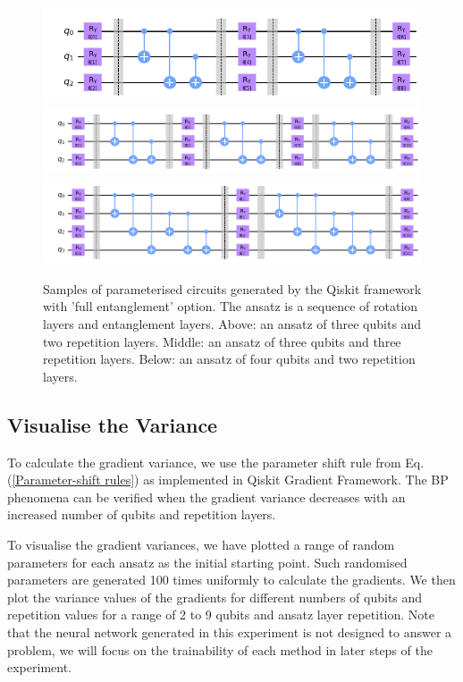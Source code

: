 \begin{figure}
    \includegraphics[width=\textwidth]{Artefact/Appendices/ansatz3-2.png}
    \includegraphics[width=\textwidth]{Artefact/Appendices/ansatz3-3.png}
    \includegraphics[width=\textwidth]{Artefact/Appendices/ansatz4-2.png}
    \caption{
        Samples of parameterised circuits generated by the Qiskit framework with 'full entanglement' option.
        The ansatz is a sequence of rotation layers and entanglement layers.
        Above: an ansatz of three qubits and two repetition layers.
        Middle: an ansatz of three qubits and three repetition layers.
        Below: an ansatz of four qubits and two repetition layers.
    }
    \label{Ansatz samples}
\end{figure}

\subsection{Visualise the Variance}
To calculate the gradient variance, we use the parameter shift rule from Eq. (\ref{Parameter-shift rules}) as implemented in Qiskit Gradient Framework.
The BP phenomena can be verified when the gradient variance decreases with an increased number of qubits and repetition layers.

To visualise the gradient variances, we have plotted a range of random parameters for each ansatz as the initial starting point.
Such randomised parameters are generated 100 times uniformly to calculate the gradients.
We then plot the variance values of the gradients for different numbers of qubits and repetition values for a range of 2 to 9 qubits and ansatz layer repetition.
Note that the neural network generated in this experiment is not designed to answer a problem, we will focus on the trainability of each method in later steps of the experiment.

